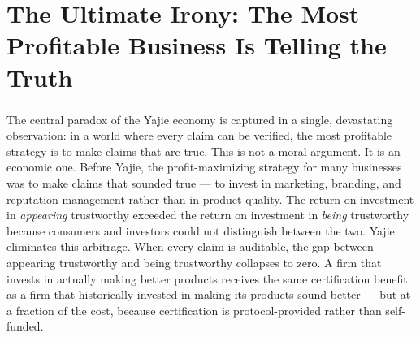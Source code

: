 \documentclass[12pt,a4paper]{article}
\theoremstyle{remark}
\begin{document}
\part{The Ultimate Irony: The Most Profitable Business Is Telling the Truth}
\section{}
The central paradox of the Yajie economy is captured in a single, devastating observation: 
in a world where every claim can be verified, the most profitable strategy is to make 
claims that are true. This is not a moral argument. It is an economic one.
Before Yajie, the profit-maximizing strategy for many businesses was to make claims that 
sounded true --- to invest in marketing, branding, and reputation management rather than in 
product quality. The return on investment in \textit{appearing} trustworthy exceeded the 
return on investment in \textit{being} trustworthy because consumers and investors could 
not distinguish between the two.
Yajie eliminates this arbitrage. When every claim is auditable, the gap between appearing 
trustworthy and being trustworthy collapses to zero. A firm that invests in actually making 
better products receives the same certification benefit as a firm that historically 
invested in making its products sound better --- but at a fraction of the cost, because 
certification is protocol-provided rather than self-funded.
\end{document}
